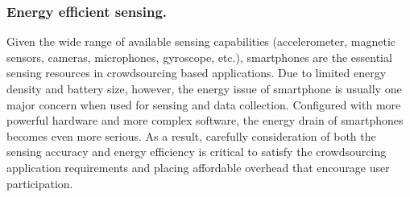 \subsubsection{\textbf{Energy efficient sensing.}} Given the wide range of available sensing capabilities (accelerometer, magnetic sensors, cameras, microphones, gyroscope, etc.), smartphones are the essential sensing resources in crowdsourcing based applications. Due to limited energy density and battery size, however, the energy issue of smartphone is usually one major concern when used for sensing and data collection. Configured with more powerful hardware and more complex software, the energy drain of smartphones becomes even more serious. As a result, carefully consideration of both the sensing accuracy and energy efficiency is critical to satisfy the crowdsourcing application requirements and placing affordable overhead that encourage user participation.

